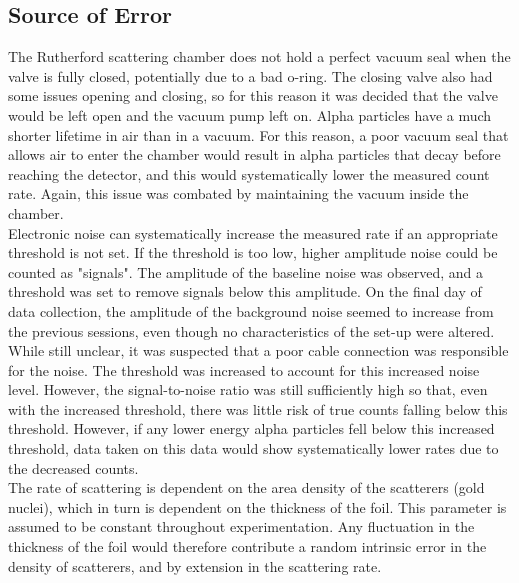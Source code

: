 \documentclass[a4paper]{article}
\begin{document}
\subsection{Source of Error}

\qq The Rutherford scattering chamber does not hold a perfect vacuum
seal when the valve is fully closed, potentially due to a bad o-ring. The closing valve also had some issues opening and closing, so for this reason it was decided that the valve would be left open and the vacuum pump left on. Alpha particles have a much shorter lifetime in air than in a vacuum. For this reason, a poor vacuum seal that allows air to enter the chamber would result in alpha particles that decay before reaching the detector, and this would systematically lower the measured count rate. Again, this issue was
combated by maintaining the vacuum inside the chamber. \\
\qq Electronic noise can systematically increase the measured rate if an appropriate threshold is not set. If the threshold is too low, higher amplitude noise could be counted as "signals". The amplitude of the baseline noise was observed, and a threshold was set to remove signals below this amplitude. On the final day of data collection, the amplitude of the background noise seemed to increase from the previous
sessions, even though no characteristics of the set-up were altered. While still unclear, it was suspected that a poor cable connection was responsible for the noise. The threshold was increased to account for this increased noise level. However, the
signal-to-noise ratio was still sufficiently high so that, even with the increased threshold, there was little risk of true counts falling below this threshold. However, if any lower energy alpha particles fell below this increased threshold, data taken on this data would show systematically lower rates due to the decreased counts. \\
\qq The rate of scattering is dependent on the area density of the
scatterers (gold nuclei), which in turn is dependent on the thickness of the foil. This parameter is assumed to be constant throughout experimentation. Any fluctuation in the thickness of the foil would therefore contribute a random intrinsic error in the
density of scatterers, and by extension in the scattering rate. 
\end{document}
